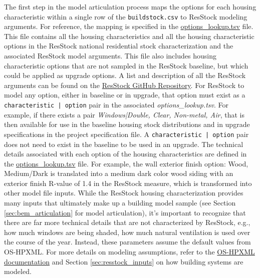 The first step in the model articulation process maps the options for each housing characteristic within a single row of the \texttt{buildstock.csv} to ResStock modeling arguments. For reference, the mapping is specified in the \href{https://github.com/NREL/resstock/blob/v3.3.0/resources/options_lookup.tsv}{options\_lookup.tsv} file. This file contains all the housing characteristics and all the housing characteristic options in the ResStock national residential stock characterization and the associated ResStock model arguments. This file also includes housing characteristic options that are not sampled in the ResStock baseline, but which could be applied as upgrade options. A list and description of all the ResStock arguments can be found on the \href{https://github.com/NREL/resstock/tree/v3.3.0/measures/ResStockArguments}{ResStock GitHub Repository}. For ResStock to model any option, either in baseline or in upgrade, that option must exist as a \texttt{characteristic | option}  pair in the associated \textit{options\_lookup.tsv}. For example, if there exists a pair \textit{Windows|Double, Clear, Non-metal, Air}, that is then available for use in the baseline housing stock distributions and in upgrade specifications in the project specification file. A \texttt{characteristic | option} pair does not need to exist in the baseline to be used in an upgrade. The technical details associated with each option of the housing characteristics are defined in the \href{https://github.com/NREL/resstock/blob/v3.3.0/resources/options_lookup.tsv}{options\_lookup.tsv} file. For example, the wall exterior finish option: Wood, Medium/Dark is translated into a medium dark color wood siding with an exterior finish R-value of 1.4 in the ResStock measure, which is transformed into other model file inputs. While the ResStock housing characterization provides many inputs that ultimately make up a building model sample (see Section \ref{sec:bem_articulation} for model articulation), it’s important to recognize that there are far more technical details that are not characterized by ResStock, e.g., how much windows are being shaded, how much natural ventilation is used over the course of the year. Instead, these parameters assume the default values from OS-HPXML. For more details on modeling assumptions, refer to the \href{https://openstudio-hpxml.readthedocs.io/en/v1.8.1/}{OS-HPXML documentation} and Section \ref{sec:resstock_inputs} on how building systems are modeled.

